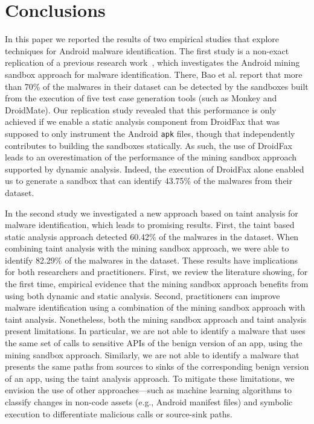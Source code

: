 \section{Conclusions}

In this paper we reported the
results of two empirical studies that explore
techniques for Android malware identification.
The first study is a non-exact replication of a
previous research work~\cite{DBLP:conf/wcre/BaoLL18},
which investigates the Android mining sandbox
approach for malware identification. There,
Bao et al. report that more than 70\% of
the malwares in their dataset can be
detected by the sandboxes built from the
execution of five test case generation
tools (such as Monkey and DroidMate). Our replication
study revealed that this performance is only
achieved if we enable a static
analysis component from DroidFax that was supposed to only
instrument the Android \texttt{apk} files,
though that independently contributes to
building the sandboxes statically. As such,
the use of DroidFax leads to an
overestimation of the performance of the
mining sandbox approach supported by dynamic analysis.
Indeed, the execution of DroidFax alone enabled
us to generate a sandbox that can
identify 43.75\% of the malwares from 
their dataset. 

In the second study we investigated
a new approach based on taint analysis
for malware identification, which
leads to promising results. First,
the taint based static analysis approach
detected 60.42\% of the
malwares in the dataset. When combining
taint analysis with the
mining sandbox approach, we were
able to identify 82.29\% of the
malwares in the dataset. These results
have implications for both researchers and
practitioners. First, we review the literature
showing, for the first time, empirical evidence
that the mining sandbox approach benefits
from using both dynamic and static analysis. Second,
practitioners can improve malware identification using
a combination of 
the mining sandbox approach with taint analysis.
Nonetheless, both the mining sandbox approach and
taint analysis present limitations. In particular,
we are not able to identify a malware that
uses the same set of calls to sensitive APIs of the
benign version of an app, using
the mining sandbox approach. Similarly, we are not
able to identify a malware that presents the same
paths from sources to sinks of the corresponding benign version of
an app, using the taint analysis approach. 
To mitigate these limitations, we envision the use of other approaches---such as machine learning
algorithms to classify changes in non-code assets (e.g., Android
manifest files) and symbolic execution to differentiate
malicious calls or source-sink paths.
